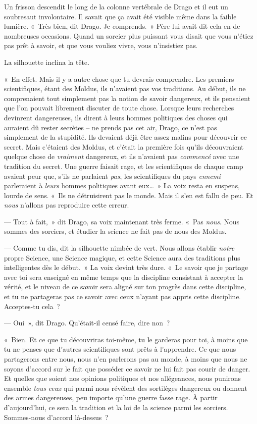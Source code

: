 Un frisson descendit le long de la colonne vertébrale de Drago et il eut un soubresaut involontaire. Il savait que ça avait été visible même dans la faible lumière. «~Très bien, dit Drago. Je comprends.~» Père lui avait dit cela en de nombreuses occasions. Quand un sorcier plus puissant vous disait que vous n'étiez pas prêt à savoir, et que vous vouliez vivre, vous n'insistiez pas.

La silhouette inclina la tête.

«~En effet. Mais il y a autre chose que tu devrais comprendre. Les premiers scientifiques, étant des Moldus, ils n'avaient pas vos traditions. Au début, ils ne comprenaient tout simplement pas la notion de savoir dangereux, et ils pensaient que l'on pouvait librement discuter de toute chose. Lorsque leurs recherches devinrent dangereuses, ils dirent à leurs hommes politiques des choses qui auraient dû rester secrètes -- ne prends pas cet air, Drago, ce n'est pas simplement de la stupidité. Ils devaient déjà être assez malins pour découvrir ce secret. Mais c'étaient des Moldus, et c'était la première fois qu'ils découvraient quelque chose de \emph{vraiment} dangereux, et ils n'avaient pas \emph{commencé} avec une tradition du secret. Une guerre faisait rage, et les scientifiques de chaque camp avaient peur que, s'ils ne parlaient \emph{pas}, les scientifiques du pays \emph{ennemi} parleraient à \emph{leurs} hommes politiques avant eux…~» La voix resta en suspens, lourde de sens. «~Ils ne détruisirent pas le monde. Mais il s'en est fallu de peu. Et \emph{nous} n'allons pas reproduire cette erreur.

--- Tout à fait,~» dit Drago, sa voix maintenant très ferme. «~Pas \emph{nous}. Nous sommes des sorciers, et étudier la science ne fait pas de nous des Moldus.

--- Comme tu dis, dit la silhouette nimbée de vert. Nous allons établir \emph{notre} propre Science, une Science magique, et cette Science aura des traditions plus intelligentes dès le début.~» La voix devint très dure. «~Le savoir que je partage avec toi sera enseigné en même temps que la discipline consistant à accepter la vérité, et le niveau de ce savoir sera aligné sur ton progrès dans cette discipline, et tu ne partageras pas ce savoir avec ceux n'ayant pas appris cette discipline. Acceptes-tu cela~?

--- Oui~», dit Drago. Qu'était-il censé faire, dire non~?

«~Bien. Et ce que tu découvriras toi-même, tu le garderas pour toi, à moins que tu ne penses que d'autres scientifiques sont prêts à l'apprendre. Ce que nous partagerons entre nous, nous n'en parlerons pas au monde, à moins que nous ne soyons d'accord sur le fait que posséder ce savoir ne lui fait pas courir de danger. Et quelles que soient nos opinions politiques et nos allégeances, nous punirons ensemble \emph{tous ceux} qui parmi nous révèlent des sortilèges dangereux ou donnent des armes dangereuses, peu importe qu'une guerre fasse rage. À partir d'aujourd'hui, ce sera la tradition et la loi de la science parmi les sorciers. Sommes-nous d'accord là-dessus~?


